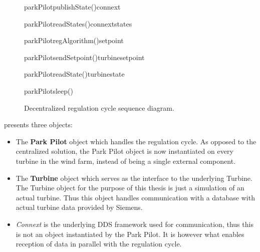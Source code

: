 \begin{figure}
	\centering
	\begin{sequencediagram} %
		
		\begin {messcall}{parkPilot}{publishState()}{connext}{}
		\end {messcall}
		\begin {call}{parkPilot}{readStates()}{connext}{states}
		\end {call}
		\begin {callself}{parkPilot}{regAlgorithm()}{setpoint}
		\end {callself}
		\begin {call}{parkPilot}{sendSetpoint()}{turbine}{setpoint}
		\end {call}
		\begin {call}{parkPilot}{readState()}{turbine}{state}
		\end {call}	
		\begin {callself}{parkPilot}{sleep()}{}
		\end {callself}			
	\end{sequencediagram}

	\caption[Decentralized regulation cycle sequence diagram]{
		\label{fig:decenRegCycle} 
		\footnotesize{%
			Decentralized regulation cycle sequence diagram.
		}
	}
\end{figure}

 presents three objects:

\begin{itemize}
	\item The \textbf{Park Pilot} object which handles the regulation cycle. As opposed to the centralized solution, the Park Pilot object is now instantiated on every turbine in the wind farm, instead of being a single external component.
	\item The \textbf{Turbine} object which serves as the interface to the underlying Turbine. The Turbine object for the purpose of this thesis is just a simulation of an actual turbine. Thus this object handles communication with a database with actual turbine data provided by Siemens.
	\item \textit{Connext} is the underlying DDS framework used for communication, thus this is not an object instantiated by the Park Pilot. It is however what enables reception of data in parallel with the regulation cycle. 
\end{itemize}

